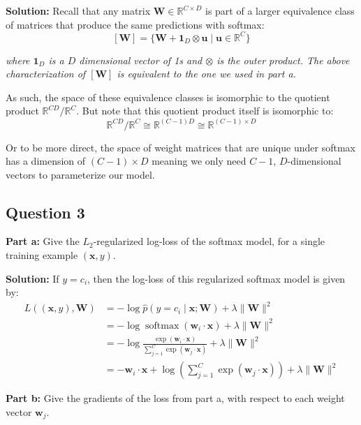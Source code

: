 \documentclass{article}
\renewcommand{\vec}[1]{\mathbf{#1}}
\newcommand{\mat}[1]{\mathbf{#1}}
\begin{document}
\noindent\textbf{Solution:} Recall that any matrix $\mat W\in\mathbb R^{C\times D}$ is part of a larger equivalence class of matrices that produce the same predictions with softmax:
$$[\mat W]=\{\mat W+\vec 1_D\otimes\vec u\mid\vec u\in\mathbb{R}^C\}$$

\textit{where $\vec 1_D$ is a $D$ dimensional vector of 1s and $\otimes$ is the outer product. The above characterization of $[\mat W]$ is equivalent to the one we used in part a.}
\smallskip

As such, the space of these equivalence classes is isomorphic to the quotient product $\mathbb R^{CD}/\mathbb R^C$. But note that this quotient product itself is isomorphic to:
$$\mathbb R^{CD}/\mathbb R^C\cong\mathbb R^{(C-1)D}\cong\mathbb R^{(C-1)\times D}$$

Or to be more direct, the space of weight matrices that are unique under softmax has a dimension of $(C-1)\times D$ meaning we only need $C-1$, $D$-dimensional vectors to parameterize our model.
\bigskip

\subsection*{Question 3}
\noindent\textbf{Part a:} Give the $L_2$-regularized log-loss of the softmax model, for a single training example $(\vec x,y)$.
\bigskip

\noindent\textbf{Solution:} If $y=c_i$, then the log-loss of this regularized softmax model is given by:
\begin{align*}
    L((\vec x,y),\mat W)&=-\log\hat p(y=c_i\mid\vec x;\mat W)+\lambda\|\mat W\|^2\\
    &=-\log\operatorname{softmax}(\vec w_i\cdot\vec x)+\lambda\|\mat W\|^2\\
    &=-\log\frac{\exp(\vec w_i\cdot\vec x)}{\sum_{j=1}^C\exp(\vec w_j\cdot\vec x)}+\lambda\|\mat W\|^2\\
    &=-\vec w_i\cdot\vec x+\log\left(\sum_{j=1}^C\exp(\vec w_j\cdot\vec x)\right)+\lambda\|\mat W\|^2
\end{align*}
\bigskip

\noindent\textbf{Part b:} Give the gradients of the loss from part a, with respect to each weight vector $\vec w_j$.
\bigskip
\end{document}
